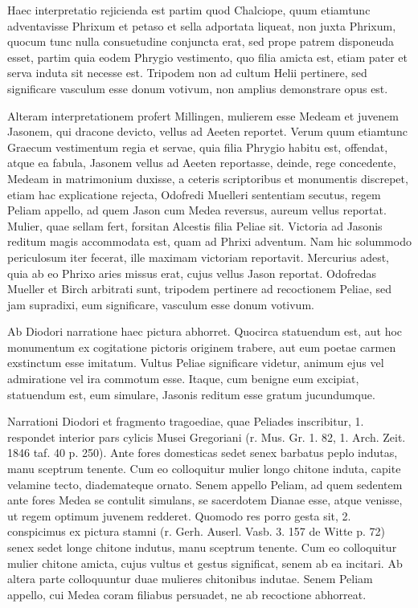 \documentclass[a4paper, 11pt, oneside, polutonikogreek, german]{article}
\begin{document}
Haec interpretatio rejicienda est partim quod Chalciope, quum etiamtunc adventavisse Phrixum et petaso et sella adportata liqueat, non juxta Phrixum, quocum tunc nulla consuetudine conjuncta erat, sed prope patrem disponeuda esset, partim quia eodem Phrygio vestimento, quo filia amicta est, etiam pater et serva induta sit necesse est. Tripodem non ad cultum Helii pertinere, sed significare vasculum esse donum votivum, non amplius demonstrare opus est.

Alteram interpretationem profert Millingen, mulierem esse Medeam et juvenem Jasonem, qui dracone devicto, vellus ad Aeeten reportet. Verum quum etiamtunc Graecum vestimentum regia et servae, quia filia Phrygio habitu est, offendat, atque ea fabula, Jasonem vellus ad Aeeten reportasse, deinde, rege concedente, Medeam in matrimonium duxisse, a ceteris scriptoribus et monumentis discrepet, etiam hac explicatione rejecta, Odofredi Muelleri sententiam secutus, regem Peliam appello, ad quem Jason cum Medea reversus, aureum vellus reportat. Mulier, quae sellam fert, forsitan Alcestis filia Peliae sit. Victoria ad Jasonis reditum magis accommodata est, quam ad Phrixi adventum. Nam hic solummodo periculosum iter fecerat, ille maximam victoriam reportavit. Mercurius adest, quia ab eo Phrixo aries missus erat, cujus vellus Jason reportat. Odofredas Mueller et Birch arbitrati sunt, tripodem pertinere ad recoctionem Peliae, sed jam supradixi, eum significare, vasculum esse donum votivum.

Ab Diodori narratione haec pictura abhorret. Quocirca statuendum est, aut hoc monumentum ex cogitatione pictoris originem trabere, aut eum poetae carmen exstinctum esse imitatum. Vultus Peliae significare videtur, animum ejus vel admiratione vel ira commotum esse. Itaque, cum benigne eum excipiat, statuendum est, eum simulare, Jasonis reditum esse gratum jucundumque.

Narrationi Diodori et fragmento tragoediae, quae Peliades inscribitur, 1. respondet interior pars cylicis Musei Gregoriani (r. Mus. Gr. 1. 82, 1. Arch. Zeit. 1846 taf. 40 p. 250). Ante fores domesticas sedet senex barbatus peplo indutas, manu sceptrum tenente. Cum eo colloquitur mulier longo chitone induta, capite velamine tecto, diademateque ornato. Senem appello Peliam, ad quem sedentem ante fores Medea se contulit simulans, se sacerdotem Dianae esse, atque venisse, ut regem optimum juvenem redderet. Quomodo res porro gesta sit, 2. conspicimus ex pictura stamni (r. Gerh. Auserl. Vasb. 3. 157 de Witte p. 72) senex sedet longe chitone indutus, manu sceptrum tenente. Cum eo colloquitur mulier chitone amicta, cujus vultus et gestus significat, senem ab ea incitari. Ab altera parte colloquuntur duae mulieres chitonibus indutae. Senem Peliam appello, cui Medea coram filiabus persuadet, ne ab recoctione abhorreat.
\end{document}
